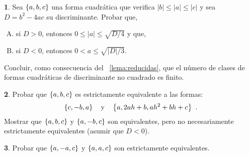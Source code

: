 \theoremstyle{definition}
\newtheorem{ejerReducidas}{\ejername}[section]



\begin{ejerReducidas}\label{ejer:reducidas:numero}
	Sea $\left\{a,b,c\right\}$ una forma cuadr\'atica que verifica
	$|b|\leq |a|\leq |c|$ y sea $D=b^2-4ac$ su discriminante.
	Probar que,%
	\begin{enumerate}[(A)]
		\item\label{ejer:reducidas:numero:indefinida}
			si $D>0$, entonces $0\leq |a|\leq\sqrt{D/4}$ y que,
		\item\label{ejer:reducidas:numer:definida}
			si $D<0$, entonces $0<a\leq\sqrt{|D|/3}$.
	\end{enumerate}
	Concluir, como consecuencia del \lemaname~\ref{lema:reducidas},
	que el n\'umero de clases de formas cuadr\'aticas de
	discriminante no cuadrado es finito.
\end{ejerReducidas}

\begin{ejerReducidas}\label{ejer:reducidas:equivalencia}
	Probar que $\left\{a,b,c\right\}$ es estrictamente equivalente a
	las formas:
	\begin{displaymath}
		\left\{c,-b,a\right\}\quad\text{y}\quad\left\{a,2ah+b,ah^2+bh+c\right\}
		\text{ .}
	\end{displaymath}
	Mostrar que $\left\{a,b,c\right\}$ y $\left\{a,-b,c\right\}$ son
	equivalentes, pero no necesariamente estrictamente equivalentes
	(asumir que $D<0$).
\end{ejerReducidas}

\begin{ejerReducidas}\label{ejer:reducidas:equivalencia:caso}
	Probar que $\left\{a,-a,c\right\}$ y $\left\{a,a,c\right\}$ son
	estrictamente equivalentes.
\end{ejerReducidas}

